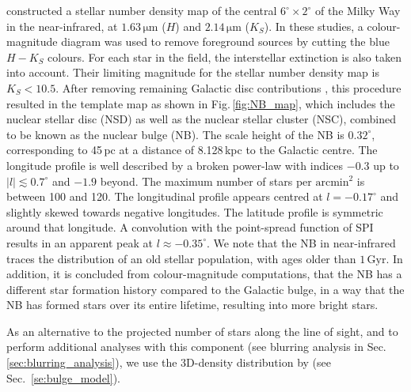 \documentclass[doublespace,nopageskip]{VTthesis}
\newcommand{\mrm}[1]{\mathrm{#1}}
\begin{document}
\citet{2013ApJ...769L..28N} constructed a stellar number density map of the central $6^{\circ} \times 2^{\circ}$ of the Milky Way in the near-infrared, at $1.63\,\mrm{\mu m}$ ($H$) and $2.14\,\mrm{\mu m}$ ($K_S$).
%
In these studies, a colour-magnitude diagram was used to remove foreground sources by cutting the blue $H-K_S$ colours.
%
For each star in the field, the interstellar extinction is also taken into account.
%
Their limiting magnitude for the stellar number density map is $K_S<10.5$.
%
After removing remaining Galactic disc contributions \citep{2018NatAs...2..387M}, this procedure resulted in the template map as shown in Fig.\,\ref{fig:NB_map}, which includes the nuclear stellar disc (NSD) as well as the nuclear stellar cluster (NSC), combined to be known as the nuclear bulge ({NB}).
%
The scale height of the {NB} is $0.32^{\circ}$, corresponding to 45\,pc at a distance of 8.128\,kpc to the Galactic centre.
%
The longitude profile is well described by a broken power-law with indices $-0.3$ up to $|l| \lesssim 0.7^{\circ}$ and $-1.9$ beyond.
%
The maximum number of stars per $\mrm{arcmin^2}$ is between 100 and 120.
%
The longitudinal profile appears centred at $l=-0.17^{\circ}$ and slightly skewed towards negative longitudes.
%
The latitude profile is symmetric around that longitude.
%
A convolution with the point-spread function of SPI results in an apparent peak at $l \approx -0.35^{\circ}$.
%
We note that the {NB} in near-infrared traces the distribution of an old stellar population, with ages older than $1\,\mrm{Gyr}$.
%
In addition, it is concluded from colour-magnitude computations, that the {NB} has a different star formation history compared to the Galactic bulge, in a way that the {NB} has formed stars over its entire lifetime, resulting into more bright stars.

As an alternative to the projected number of stars along the line of sight, and to perform additional analyses with this component (see blurring analysis in Sec.\,\ref{sec:blurring_analysis}), we use the 3D-density distribution by \citet{2002A&A...384..112L} (see Sec.~\ref{se:bulge_model}).
%

\end{document}
